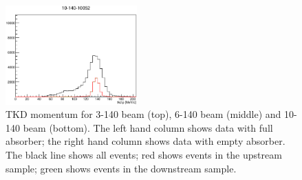 \begin{figure}[!tbh]
    \includegraphics*[width=0.45\textwidth]{analysis_plots/plots_10-140-empty/tkd_p.eps}
    \caption{TKD momentum for 3-140 beam (top), 6-140 beam (middle) and 10-140 beam (bottom).
    The left hand column shows data with full absorber; the right hand column shows data with empty absorber.
    The black line shows all events; red shows events in the upstream sample; green shows events in the downstream sample.
\label{fig:tkd_mom}}
\end{figure}

